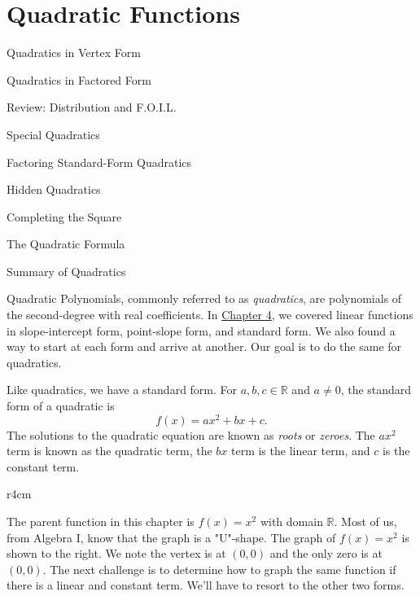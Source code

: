 \documentclass[lang=en,11pt]{elegantbook}
\begin{document}
\chapter{Quadratic Functions}
\begin{introduction}[Contents]
\item Quadratics in Vertex Form
\item Quadratics in Factored Form
\item Review: Distribution and F.O.I.L.
\item Special Quadratics
\item Factoring Standard-Form Quadratics
\item Hidden Quadratics
\item Completing the Square
\item The Quadratic Formula
\item Summary of Quadratics
\end{introduction}
\noindent Quadratic Polynomials, commonly referred to as \textit{quadratics}, are polynomials of the second-degree with real coefficients.  In \hyperlink{chapter.4}{Chapter 4}, we covered linear functions in slope-intercept form, point-slope form, and standard form.  We also found a way to start at each form and arrive at another.  Our goal is to do the same for quadratics.

Like quadratics, we have a standard form.  For $a,b,c\in\mathbb{R}$ and $a\neq 0$, the standard form of a quadratic is $$f(x)=ax^2+bx+c.$$  The solutions to the quadratic equation are known as \textit{roots} or \textit{zeroes}.  The $ax^2$ term is known as the quadratic term, the $bx$ term is the linear term, and $c$ is the constant term.
\begin{wrapfigure}{r}{4cm}
\end{wrapfigure}
The parent function in this chapter is $f(x)=x^2$ with domain $\mathbb{R}$.  Most of us, from Algebra I, know that the graph is a "U"-shape.  The graph of $f(x)=x^2$ is shown to the right.  We note the vertex is at $(0,0)$ and the only zero is at $(0,0)$.  The next challenge is to determine how to graph the same function if there is a linear and constant term.  We'll have to resort to the other two forms.
\end{document}
